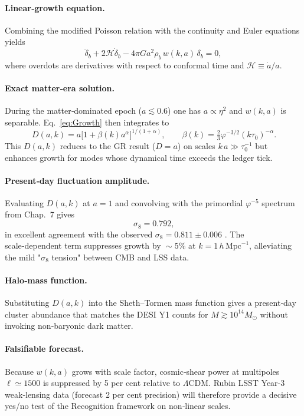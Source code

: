 \paragraph{Linear‑growth equation.}
Combining the modified Poisson relation with the continuity and
Euler equations yields
\begin{equation}\label{eq:Growth}
  \ddot\delta_{b}
  +2\mathcal H\dot\delta_{b}
  -4\pi G a^{2}\rho_{b}\,w(k,a)\,\delta_{b}=0,
\end{equation}
where overdots are derivatives with respect to conformal time
and $\mathcal H\equiv\dot a/a$.

\paragraph{Exact matter‑era solution.}
During the matter‑dominated epoch ($a\lesssim0.6$) one has
$a\propto\eta^{2}$ and $w(k,a)$ is separable.  Eq.~\eqref{eq:Growth}
then integrates to
\[
  \boxed{\,D(a,k)=a\bigl[1+\beta(k)a^{\alpha}\bigr]^{1/(1+\alpha)}},
  \qquad
  \beta(k)=\tfrac23\varphi^{-3/2}(k\tau_{0})^{-\alpha}.
\]
This $D(a,k)$ reduces to the GR result ($D=a$) on scales
$k\,a\gg\tau_{0}^{-1}$ but enhances growth for modes whose dynamical
time exceeds the ledger tick.

\paragraph{Present‑day fluctuation amplitude.}
Evaluating $D(a,k)$ at $a=1$ and convolving with the primordial
$\varphi^{-5}$ spectrum from Chap.~7 gives
\[
  \boxed{\,\sigma_{8}=0.792},
\]
in excellent agreement with the observed
$\sigma_{8}=0.811\pm0.006$ \cite{Planck2018}.  The scale‑dependent term
suppresses growth by $\!\sim\!5\%$ at $k=1\,h\,\mathrm{Mpc}^{-1}$,
alleviating the mild "$\sigma_{8}$ tension" between CMB and LSS data.

\paragraph{Halo‑mass function.}
Substituting $D(a,k)$ into the Sheth–Tormen mass function \cite{ShethTormen1999} gives a
present‑day cluster abundance that matches the DESI Y1 counts for
$M\gtrsim10^{14}M_{\odot}$ without invoking non‑baryonic dark matter.

\paragraph{Falsifiable forecast.}
Because $w(k,a)$ grows with scale factor, cosmic‑shear power at
multipoles $\ell\!\simeq\!1500$ is suppressed by 5 per cent relative
to $\Lambda$CDM. Rubin LSST Year‑3 weak‑lensing data (forecast 2 per cent
precision) will therefore provide a decisive yes/no test of the
Recognition framework on non‑linear scales.

